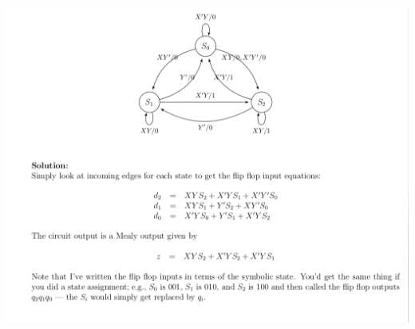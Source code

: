 \documentclass[10pt]{article}
\begin{document}
\begin{enumerate}
{    }
\\
\parbox{\linewidth}{
        \includegraphics[scale=1]{DFF2.png}
    }
\end{enumerate}



\pagebreak
\setlength{\voffset}{0.15in}
\end{document}
